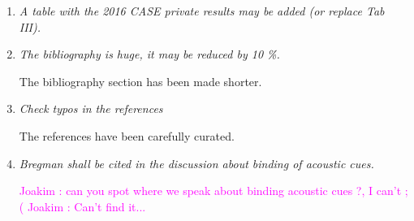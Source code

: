 \documentclass[10pt]{article}
\newcommand{\ja}[1]{\textcolor{magenta}{Joakim : #1}}
\begin{document}
\begin{enumerate}
\item \emph{A table with the 2016 CASE private results may be added (or replace Tab III).}

\item \emph{The bibliography is huge, it may be reduced by 10 \%.}

The bibliography section has been made shorter. 

\item \emph{Check typos in the references}

The references have been carefully curated.

\item \emph{Bregman shall be cited in the discussion about  binding of acoustic cues.}

\ja{can you spot where we speak about binding acoustic cues ?, I can't ;(}
\ja{Can't find it...}

\end{enumerate}
\end{document}
